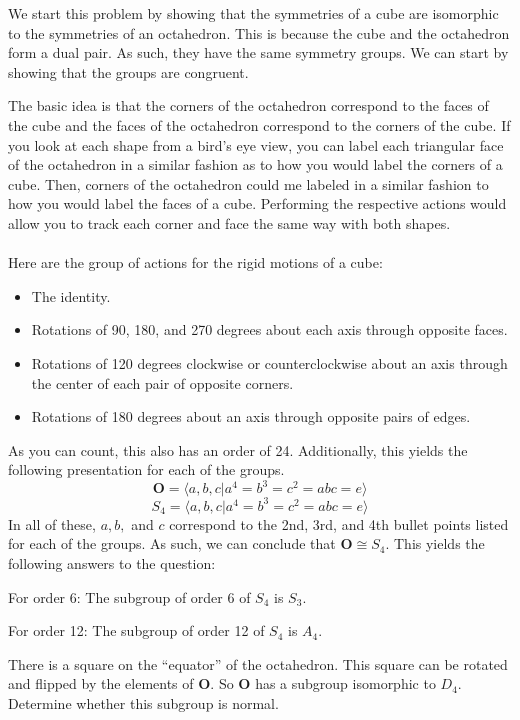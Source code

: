 \documentclass[12pt]{exam}
\newcommand{\announce}[1]
{\vspace\baselineskip{\parindent0in {\bf #1}}}
\begin{document}
\begin{questions}
\announce{Solution 2:} We start this problem by showing that the symmetries of a cube are isomorphic to the symmetries of an octahedron. This is because the cube and the octahedron form a dual pair. As such, they have the same symmetry groups. We can start by showing that the groups are congruent.

The basic idea is that the corners of the octahedron correspond to the faces of the cube and the faces of the octahedron correspond to the corners of the cube. If you look at each shape from a bird's eye view, you can label each triangular face of the octahedron in a similar fashion as to how you would label the corners of a cube. Then, corners of the octahedron could me labeled in a similar fashion to how you would label the faces of a cube. Performing the respective actions would allow you to track each corner and face the same way with both shapes. 
\\ \\ 
Here are the group of actions for the rigid motions of a cube:
\begin{itemize}
	\item The identity.
	\item Rotations of 90, 180, and 270 degrees about each axis through opposite faces.
	\item Rotations of 120 degrees clockwise or counterclockwise about an axis through the center of each pair of opposite corners.
	\item Rotations of 180 degrees about an axis through opposite pairs of edges. 
\end{itemize}
As you can count, this also has an order of 24. Additionally, this yields the following presentation for each of the groups.
$$\mathbf O = \langle a, b, c | a^4 = b^3 = c^2 = abc = e\rangle$$
$$S_4 = \langle a, b, c | a^4 = b^3 = c^2 = abc = e\rangle$$
In all of these, $a, b,$ and $c$ correspond to the 2nd, 3rd, and 4th bullet points listed for each of the groups. As such, we can conclude that $\mathbf O \cong S_4$. This yields the following answers to the question:

For order 6: The subgroup of order 6 of $S_4$ is $\boxed{S_3}$.

For order 12: The subgroup of order 12 of $S_4$ is $\boxed{A_4}$. 
\clearpage

\question There is a square on the ``equator'' of the octahedron.  This square can be rotated and flipped by the elements of $\mathbf O$.  So $\mathbf O$ has a subgroup isomorphic to $D_4$.  Determine whether this subgroup is normal.


\end{questions}
\end{document}
